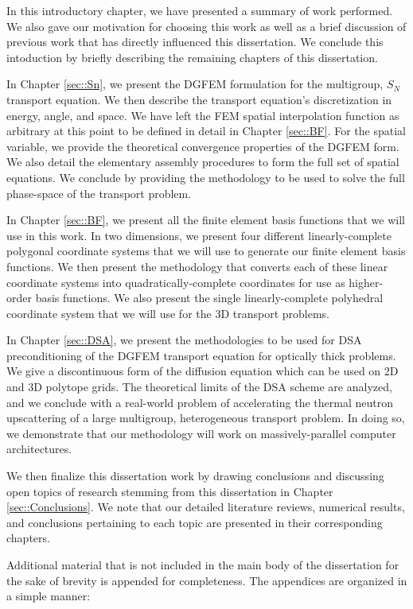 In this introductory chapter, we have presented a summary of work performed. We also gave our motivation for choosing this work as well as a brief discussion of previous work that has directly influenced this dissertation. We conclude this intoduction by briefly describing the remaining chapters of this dissertation.

In Chapter \ref{sec::Sn}, we present the DGFEM formulation for the multigroup, $S_N$ transport equation. We then describe the transport equation's discretization in energy, angle, and space. We have left the FEM spatial interpolation function as arbitrary at this point to be defined in detail in Chapter \ref{sec::BF}. For the spatial variable, we provide the theoretical convergence properties of the DGFEM form. We also detail the elementary assembly procedures to form the full set of spatial equations. We conclude by providing the methodology to be used to solve the full phase-space of the transport problem.

In Chapter \ref{sec::BF}, we present all the finite element basis functions that we will use in this work. In two dimensions, we present four different linearly-complete polygonal coordinate systems that we will use to generate our finite element basis functions. We then present the methodology that converts each of these linear coordinate systems into quadratically-complete coordinates for use as higher-order basis functions. We also present the single linearly-complete polyhedral coordinate system that we will use for the 3D transport problems.

In Chapter \ref{sec::DSA}, we present the methodologies to be used for DSA preconditioning of the DGFEM transport equation for optically thick problems. We give a discontinuous form of the diffusion equation which can be used on 2D and 3D polytope grids. The theoretical limits of the DSA scheme are analyzed, and we conclude with a real-world problem of accelerating the thermal neutron upscattering of a large multigroup, heterogeneous transport problem. In doing so, we demonstrate that our methodology will work on massively-parallel computer architectures.

We then finalize this dissertation work by drawing conclusions and discussing open topics of research stemming from this dissertation in Chapter \ref{sec::Conclusions}. We note that our detailed literature reviews, numerical results, and conclusions pertaining to each topic are presented in their corresponding chapters.

Additional material that is not included in the main body of the dissertation for the sake of brevity is appended for completeness. The appendices are organized in a simple manner:

